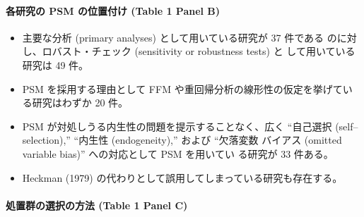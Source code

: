 \paragraph{各研究の PSM の位置付け (Table 1 Panel B)}

\begin{itemize}
 \item 主要な分析 (primary analyses) として用いている研究が 37 件である
       のに対し、ロバスト・チェック (sensitivity or robustness tests) と
       して用いている研究は 49 件。
 \item PSM を採用する理由として FFM や重回帰分析の線形性の仮定を挙げてい
       る研究はわずか 20 件。
 \item PSM が対処しうる内生性の問題を提示することなく、広く ``自己選択
       (self--selection),'' ``内生性 (endogeneity),'' および ``欠落変数
       バイアス (omitted variable bias)'' への対応として PSM を用いてい
       る研究が 33 件ある。
 \item Heckman (1979) の代わりとして誤用してしまっている研究も存在する。
\end{itemize}

\paragraph{処置群の選択の方法 (Table 1 Panel C)}

